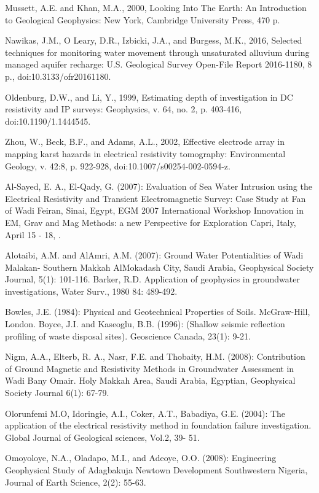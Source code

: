 \documentclass[12pt,a4paper]{report}
\begin{document}
Mussett, A.E. and Khan, M.A., 2000, Looking Into The Earth: An Introduction to Geological Geophysics: New York, Cambridge University Press, 470 p.

Nawikas, J.M., O Leary, D.R., Izbicki, J.A., and Burgess, M.K., 2016, Selected techniques for monitoring water movement through unsaturated alluvium during managed aquifer recharge: U.S. Geological Survey Open-File Report 2016-1180, 8 p., doi:10.3133/ofr20161180.

Oldenburg, D.W., and Li, Y., 1999, Estimating depth of investigation in DC resistivity and IP surveys: Geophysics, v. 64, no. 2, p. 403-416, doi:10.1190/1.1444545.

Zhou, W., Beck, B.F., and Adams, A.L., 2002, Effective electrode array in mapping karst hazards in electrical resistivity tomography: Environmental Geology, v. 42:8, p. 922-928, doi:10.1007/s00254-002-0594-z.

Al-Sayed, E. A., El-Qady, G. (2007): Evaluation of Sea Water Intrusion using the Electrical Resistivity and Transient Electromagnetic Survey: Case Study at Fan of Wadi Feiran, Sinai, Egypt, EGM 2007 International Workshop Innovation in EM, Grav and Mag Methods: a new Perspective for Exploration Capri, Italy, April 15 - 18, . 

Alotaibi, A.M. and AlAmri, A.M. (2007): Ground Water Potentialities of Wadi Malakan- Southern Makkah AlMokadash City, Saudi Arabia, Geophysical Society Journal, 5(1): 101-116. Barker, R.D. Application of geophysics in groundwater investigations, Water Surv., 1980 84: 489-492. 

Bowles, J.E. (1984): Physical and Geotechnical Properties of Soils. McGraw-Hill, London. Boyce, J.I. and Kaseoglu, B.B. (1996): (Shallow seismic reflection profiling of waste disposal sites). Geoscience Canada, 23(1): 9-21. 

Nigm, A.A., Elterb, R. A., Nasr, F.E. and Thobaity, H.M. (2008): Contribution of Ground Magnetic and Resistivity Methods in Groundwater Assessment in Wadi Bany Omair. Holy Makkah Area, Saudi Arabia, Egyptian, Geophysical Society Journal 6(1): 67-79. 

Olorunfemi M.O, Idoringie, A.I., Coker, A.T., Babadiya, G.E. (2004): The application of the electrical resistivity method in foundation failure investigation. Global Journal of Geological sciences, Vol.2, 39- 51.

Omoyoloye, N.A., Oladapo, M.I., and Adeoye, O.O. (2008): Engineering Geophysical Study of Adagbakuja Newtown Development Southwestern Nigeria, Journal of Earth Science, 2(2): 55-63. 
\end{document}
